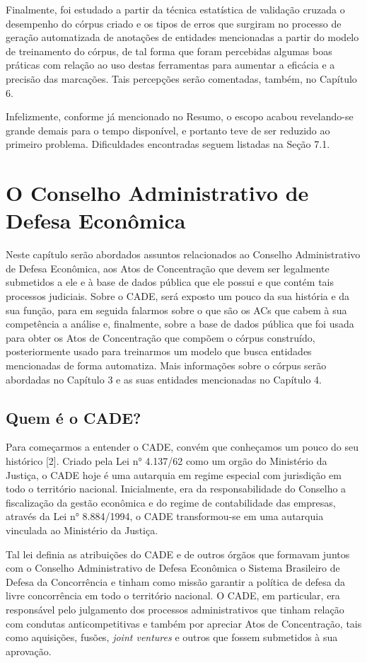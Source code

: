 \documentclass[11pt]{report}
\begin{document}
Finalmente, foi estudado a partir da técnica estatística de validação cruzada o desempenho do córpus criado e os tipos de erros que surgiram no processo de geração automatizada
de anotações de entidades mencionadas a partir do modelo de treinamento do córpus, de tal forma que foram percebidas algumas boas práticas com relação ao uso destas ferramentas
para aumentar a eficácia e a precisão das marcações. Tais percepções serão comentadas, também, no Capítulo 6.

Infelizmente, conforme já mencionado no Resumo, o escopo acabou revelando-se grande demais para o tempo disponível, e portanto teve de ser reduzido
ao primeiro problema. Dificuldades encontradas seguem listadas na Seção 7.1.

\pagebreak
\chapter{O Conselho Administrativo de Defesa Econômica}

\indent\indent Neste capítulo serão abordados assuntos relacionados ao Conselho Administrativo de Defesa Econômica, aos Atos de Concentração que devem ser legalmente submetidos a ele e à base de dados pública que ele possui e
que contém tais processos judiciais. Sobre o CADE, será exposto um pouco da sua história e da sua função, para em seguida falarmos sobre o que são os ACs que cabem à sua competência
a análise e, finalmente, sobre a base de dados pública que foi usada para obter os Atos de Concentração que compõem o córpus construído, posteriormente usado para treinarmos um modelo
que busca entidades mencionadas de forma automatiza. Mais informações sobre o córpus serão abordadas no Capítulo 3 e as suas entidades mencionadas no Capítulo 4.

\section{Quem é o CADE?}

\indent\indent Para começarmos a entender o CADE, convém que conheçamos um pouco do seu histórico [2]. Criado pela Lei n° 4.137/62 como um orgão do Ministério da Justiça, o CADE hoje é uma autarquia em regime especial com jurisdição em todo o território nacional. Inicialmente,
era da responsabilidade do Conselho a fiscalização da gestão econômica e do regime de contabilidade das empresas, através da Lei n° 8.884/1994, o CADE transformou-se em uma
autarquia vinculada ao Ministério da Justiça.

Tal lei definia as atribuições do CADE e de outros órgãos que formavam juntos com o Conselho Administrativo de Defesa Econômica o Sistema Brasileiro de Defesa da Concorrência e tinham
como missão garantir a política de defesa da livre concorrência em todo o território nacional. O CADE, em particular, era responsável pelo julgamento dos processos administrativos
que tinham relação com condutas anticompetitivas e também por apreciar Atos de Concentração, tais como aquisições, fusões, \textit{joint ventures} e outros que fossem submetidos
à sua aprovação.
\end{document}
